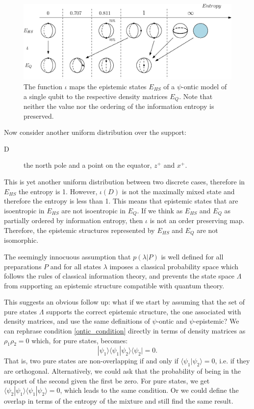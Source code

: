 \documentclass[twocolumn,prl,floatfix,superscriptaddress]{revtex4-2}
\begin{document}
\begin{figure}
\includegraphics[scale=.4]{fig2}
\caption{\footnotesize{The function $\iota$ maps the epistemic states $E_{HS}$ of a $\psi$-ontic model of a single qubit to the respective density matrices $E_Q$. Note that neither the value nor the ordering of the information entropy is preserved.}}\label{fig_map}
\end{figure}

Now consider another uniform distribution over the support:
\begin{description}
	\item[D] the north pole and a point on the equator, $z^+$ and $x^+$.
\end{description}
This is yet another uniform distribution between two discrete cases, therefore in $E_{HS}$ the entropy is 1. However, $\iota(D)$ is not the maximally mixed state and therefore the entropy is less than 1. This means that epistemic states that are isoentropic in $E_{HS}$ are not isoentropic in $E_{Q}$. If we think as $E_{HS}$ and $E_{Q}$ as partially ordered by information entropy, then $\iota$ is not an order preserving map. Therefore, the epistemic structures represented by $E_{HS}$ and $E_{Q}$ are not isomorphic.

The seemingly innocuous assumption that $p(\lambda|P)$ is well defined for all preparations $P$ and for all states $\lambda$ imposes a classical probability space which follows the rules of classical information theory, and prevents the state space $\Lambda$ from supporting an epistemic structure compatible with quantum theory. 

This suggests an obvious follow up: what if we start by assuming that the set of pure states $\Lambda$ supports the correct epistemic structure, the one associated with density matrices, and use the same definitions of $\psi$-ontic and $\psi$-epistemic? We can rephrase condition \ref{ontic_condition} directly in terms of density matrices as $\rho_1 \rho_2 = 0$ which, for pure states, becomes:
\begin{equation}
	|\psi_1\rangle\langle\psi_1|\psi_2\rangle\langle\psi_2| = 0.
\end{equation}
That is, two pure states are non-overlapping if and only if $\langle\psi_1|\psi_2\rangle=0$, i.e. if they are orthogonal. Alternatively, we could ask that the probability of being in the support of the second given the first be zero. For pure states, we get $\langle\psi_2|\psi_1\rangle\langle\psi_1|\psi_2\rangle = 0$, which leads to the same condition. Or we could define the overlap in terms of the entropy of the mixture and still find the same result.
\end{document}
